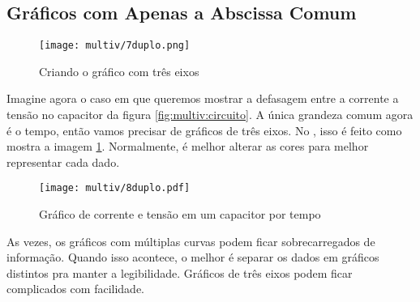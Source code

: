 \subsection{Gráficos com Apenas a Abscissa Comum}

    \begin{figure}[htbp]
        \centering
        \texttt{[image: multiv/7duplo.png]}

        \caption{Criando o gráfico com três eixos}
        \label{fig:multiv:duplo:tutorial}
    \end{figure}

    Imagine agora o caso em que queremos mostrar a defasagem entre a corrente a tensão no capacitor da figura \ref{fig:multiv:circuito}. A única grandeza comum agora é o tempo, então vamos precisar de gráficos de três eixos. No \software, isso é feito como mostra a imagem \ref{fig:multiv:duplo:tutorial}. Normalmente, é melhor alterar as cores para melhor representar cada dado.

    \begin{figure}[htbp]
        \centering
        \texttt{[image: multiv/8duplo.pdf]}

        \caption{Gráfico de corrente e tensão em um capacitor por tempo}
        \label{fig:multiv:duplo}
    \end{figure}

    \begin{nota}
        As vezes, os gráficos com múltiplas curvas podem ficar sobrecarregados de informação. Quando isso acontece, o melhor é separar os dados em gráficos distintos pra manter a legibilidade. Gráficos de três eixos podem ficar complicados com facilidade.
    \end{nota}
